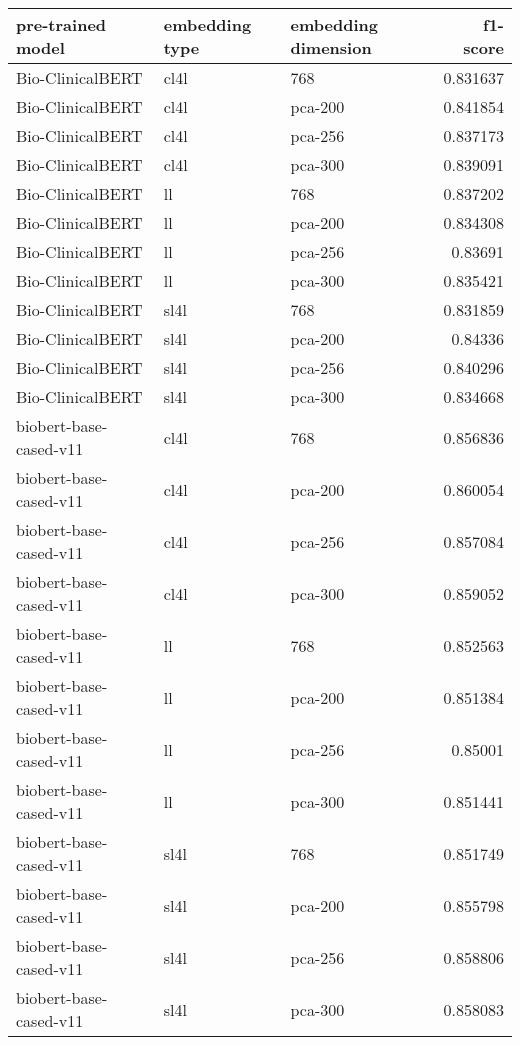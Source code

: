 \begin{tabular}{lllr}
\hline
 pre-trained model      & embedding type   & embedding dimension   &   f1-score \\
\hline
 Bio-ClinicalBERT       & cl4l             & 768                   &   0.831637 \\
 Bio-ClinicalBERT       & cl4l             & pca-200               &   0.841854 \\
 Bio-ClinicalBERT       & cl4l             & pca-256               &   0.837173 \\
 Bio-ClinicalBERT       & cl4l             & pca-300               &   0.839091 \\
 Bio-ClinicalBERT       & ll               & 768                   &   0.837202 \\
 Bio-ClinicalBERT       & ll               & pca-200               &   0.834308 \\
 Bio-ClinicalBERT       & ll               & pca-256               &   0.83691  \\
 Bio-ClinicalBERT       & ll               & pca-300               &   0.835421 \\
 Bio-ClinicalBERT       & sl4l             & 768                   &   0.831859 \\
 Bio-ClinicalBERT       & sl4l             & pca-200               &   0.84336  \\
 Bio-ClinicalBERT       & sl4l             & pca-256               &   0.840296 \\
 Bio-ClinicalBERT       & sl4l             & pca-300               &   0.834668 \\
 biobert-base-cased-v11 & cl4l             & 768                   &   0.856836 \\
 biobert-base-cased-v11 & cl4l             & pca-200               &   0.860054 \\
 biobert-base-cased-v11 & cl4l             & pca-256               &   0.857084 \\
 biobert-base-cased-v11 & cl4l             & pca-300               &   0.859052 \\
 biobert-base-cased-v11 & ll               & 768                   &   0.852563 \\
 biobert-base-cased-v11 & ll               & pca-200               &   0.851384 \\
 biobert-base-cased-v11 & ll               & pca-256               &   0.85001  \\
 biobert-base-cased-v11 & ll               & pca-300               &   0.851441 \\
 biobert-base-cased-v11 & sl4l             & 768                   &   0.851749 \\
 biobert-base-cased-v11 & sl4l             & pca-200               &   0.855798 \\
 biobert-base-cased-v11 & sl4l             & pca-256               &   0.858806 \\
 biobert-base-cased-v11 & sl4l             & pca-300               &   0.858083 \\
\hline
\end{tabular}